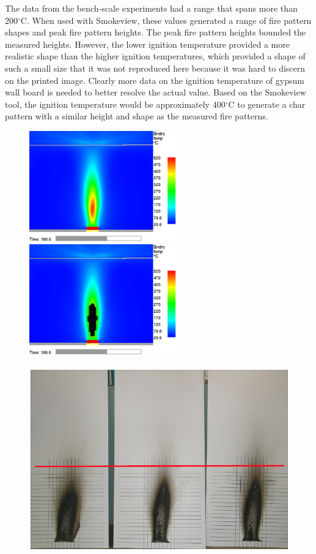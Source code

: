 \documentclass[twoside]{uocthesis}
\begin{document}
{The data from the bench-scale experiments had a range that spans more than 200$^\circ$C. When used with Smokeview, these values generated a range of fire pattern shapes and peak fire pattern heights.  The peak fire pattern heights bounded the measured heights. However, the lower ignition temperature provided a more realistic shape than the higher ignition temperatures, which provided a shape of such a small size that it was not reproduced here because it was hard to discern on the printed image.  Clearly more data on the ignition temperature of gypsum wall board is needed to better resolve the actual value.  Based on the Smokeview tool, the ignition temperature would be approximately 400$^\circ$C to generate a char pattern with a similar height and shape as the measured fire patterns.

\begin{figure}[h]
  \centering
  \includegraphics[width=2.5in]{../Figures/WallTemp_10mm_0D_0_8m_guideline}
  \includegraphics[width=2.5in]{../Figures/350CThresholdwall_temp_0_8m_guideline}\\
  \hspace{4 mm}  \\ 
  \includegraphics[width=.625\columnwidth]{../Figures/GBNGreps_w_1m_guideline}\\

\end{figure}}
\end{document}
